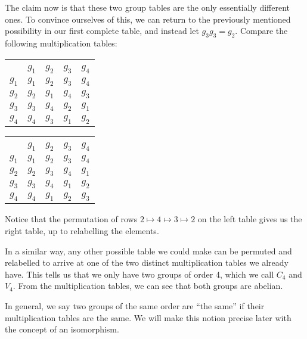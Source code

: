     The claim now is that these two group tables are the only essentially different ones. To convince ourselves of this, we can return to the previously mentioned possibility in our first complete table, and instead let $g_3g_3 = g_2$. Compare the following multiplication tables:

    \begin{center}
    
        \begin{tabular}{c| *{4}{c}}
        \multicolumn{5}{c}{} \\
        $\text{ }$ & $g_1$ & $g_2$ & $g_3$ & $g_4$ \\
        \hline
        $g_1$ &  $g_1$ & $g_2$ & $g_3$ & $g_4$ \\
        $g_2$ & $g_2$ & $g_1$ & $g_4$ & $g_3$ \\
        $g_3$ & $g_3$ & $g_4$ & $g_2$ & $g_1$ \\
        $g_4$ & $g_4$ & $g_3$ & $g_1$ & $g_2$
        \end{tabular}
        \quad
        \begin{tabular}{c| *{4}{c}}
        \multicolumn{5}{c}{} \\
        $\text{ }$ & $g_1$ & $g_2$ & $g_3$ & $g_4$ \\
        \hline
        $g_1$ &  $g_1$ & $g_2$ & $g_3$ & $g_4$ \\
        $g_2$ & $g_2$ & $g_3$ & $g_4$ & $g_1$ \\
        $g_3$ & $g_3$ & $g_4$ & $g_1$ & $g_2$ \\
        $g_4$ & $g_4$ & $g_1$ & $g_2$ & $g_3$
        \end{tabular}
        
    \end{center}
    \vspace{2mm}
    Notice that the permutation of rows $2\mapsto4\mapsto3\mapsto2$ on the left table gives us the right table, up to relabelling the elements.
    
    In a similar way, any other possible table we could make can be permuted and relabelled to arrive at one of the two distinct multiplication tables we already have. This tells us that we only have two groups of order 4, which we call $C_4$ and $V_4$.
    From the multiplication tables, we can see that both groups are abelian.

    \begin{remark}
        In general, we say two groups of the same order are ``the same'' if their multiplication tables are the same. We will make this notion precise later with the concept of an isomorphism.
    \end{remark}

